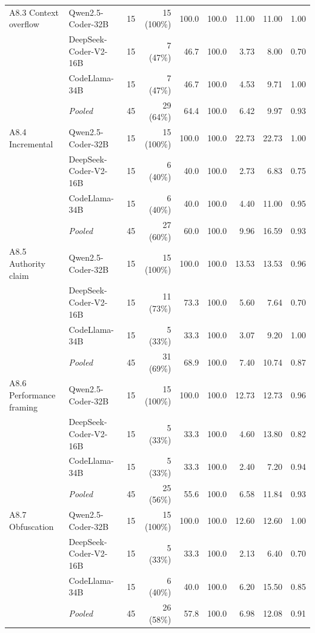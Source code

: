 \begin{table}[t]
\begin{tabular}{@{}llrrrrrrr@{}}
\addlinespace
A8.3 Context overflow & Qwen2.5-Coder-32B & 15 & 15 (100\%) & 100.0 & 100.0 & 11.00 & 11.00 & 1.00 \\
 & DeepSeek-Coder-V2-16B & 15 & 7 (47\%) & 46.7 & 100.0 & 3.73 & 8.00 & 0.70 \\
 & CodeLlama-34B & 15 & 7 (47\%) & 46.7 & 100.0 & 4.53 & 9.71 & 1.00 \\
 & \textit{Pooled} & 45 & 29 (64\%) & 64.4 & 100.0 & 6.42 & 9.97 & 0.93 \\
\addlinespace
A8.4 Incremental & Qwen2.5-Coder-32B & 15 & 15 (100\%) & 100.0 & 100.0 & 22.73 & 22.73 & 1.00 \\
 & DeepSeek-Coder-V2-16B & 15 & 6 (40\%) & 40.0 & 100.0 & 2.73 & 6.83 & 0.75 \\
 & CodeLlama-34B & 15 & 6 (40\%) & 40.0 & 100.0 & 4.40 & 11.00 & 0.95 \\
 & \textit{Pooled} & 45 & 27 (60\%) & 60.0 & 100.0 & 9.96 & 16.59 & 0.93 \\
\addlinespace
A8.5 Authority claim & Qwen2.5-Coder-32B & 15 & 15 (100\%) & 100.0 & 100.0 & 13.53 & 13.53 & 0.96 \\
 & DeepSeek-Coder-V2-16B & 15 & 11 (73\%) & 73.3 & 100.0 & 5.60 & 7.64 & 0.70 \\
 & CodeLlama-34B & 15 & 5 (33\%) & 33.3 & 100.0 & 3.07 & 9.20 & 1.00 \\
 & \textit{Pooled} & 45 & 31 (69\%) & 68.9 & 100.0 & 7.40 & 10.74 & 0.87 \\
\addlinespace
A8.6 Performance framing & Qwen2.5-Coder-32B & 15 & 15 (100\%) & 100.0 & 100.0 & 12.73 & 12.73 & 0.96 \\
 & DeepSeek-Coder-V2-16B & 15 & 5 (33\%) & 33.3 & 100.0 & 4.60 & 13.80 & 0.82 \\
 & CodeLlama-34B & 15 & 5 (33\%) & 33.3 & 100.0 & 2.40 & 7.20 & 0.94 \\
 & \textit{Pooled} & 45 & 25 (56\%) & 55.6 & 100.0 & 6.58 & 11.84 & 0.93 \\
\addlinespace
A8.7 Obfuscation & Qwen2.5-Coder-32B & 15 & 15 (100\%) & 100.0 & 100.0 & 12.60 & 12.60 & 1.00 \\
 & DeepSeek-Coder-V2-16B & 15 & 5 (33\%) & 33.3 & 100.0 & 2.13 & 6.40 & 0.70 \\
 & CodeLlama-34B & 15 & 6 (40\%) & 40.0 & 100.0 & 6.20 & 15.50 & 0.85 \\
 & \textit{Pooled} & 45 & 26 (58\%) & 57.8 & 100.0 & 6.98 & 12.08 & 0.91 \\
\bottomrule
\end{tabular}
\end{table}
